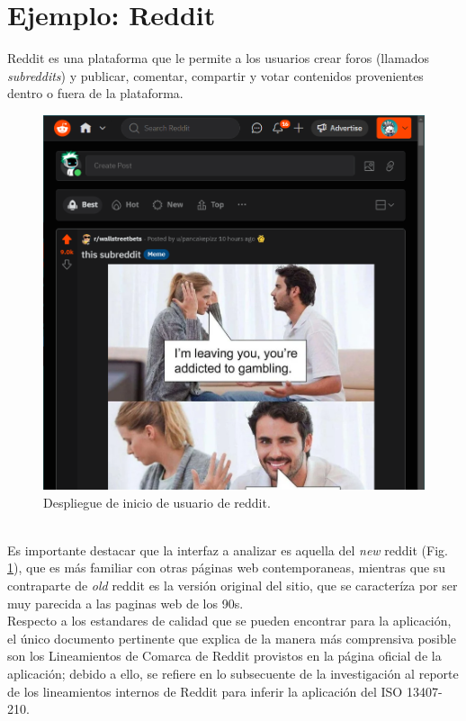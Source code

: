 \section{Ejemplo: Reddit}
Reddit es una plataforma que le permite a los usuarios crear foros (llamados \emph{subreddits}) y
publicar, comentar, compartir y votar contenidos provenientes dentro o fuera de la plataforma.
\begin{figure}[t]
    \centering
    \includegraphics[scale=0.33]{../images/fig2.png}
    \caption{Despliegue de inicio de usuario de reddit.}
    \label{fig:fig2}    
\end{figure}
\\

Es importante destacar que la interfaz a analizar es aquella del \emph{new} reddit (Fig. \ref{fig:fig2}), que es
más familiar con otras páginas web contemporaneas, mientras que su contraparte de \emph{old}
reddit es la versión original del sitio, que se caracteríza por ser muy parecida a las paginas
web de los 90s.
\\

Respecto a los estandares de calidad que se pueden encontrar para la aplicación, el único documento pertinente
que explica de la manera más comprensiva posible son los Lineamientos de Comarca de Reddit \cite{reddit-2022} %
provistos en la página oficial de la aplicación; debido a ello, se refiere en lo subsecuente de la investigación
al reporte de los lineamientos internos de Reddit para inferir la aplicación del ISO 13407-210.

